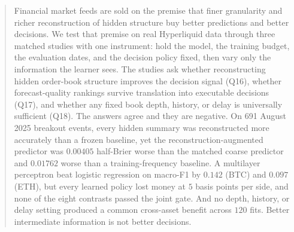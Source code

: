 \begin{abstract}
Financial market feeds are sold on the premise that finer granularity and richer
reconstruction of hidden structure buy better predictions and better decisions. We test
that premise on real Hyperliquid data through three matched studies with one instrument:
hold the model, the training budget, the evaluation dates, and the decision policy fixed,
then vary only the information the learner sees. The studies ask whether reconstructing
hidden order-book structure improves the decision signal (Q16), whether forecast-quality
rankings survive translation into executable decisions (Q17), and whether any fixed book
depth, history, or delay is universally sufficient (Q18). The answers agree and they are
negative. On 691 August 2025 breakout events, every hidden summary was reconstructed more
accurately than a frozen baseline, yet the reconstruction-augmented predictor was $0.00405$
half-Brier worse than the matched coarse predictor and $0.01762$ worse than a
training-frequency baseline. A multilayer perceptron beat logistic regression on macro-F1
by $0.142$ (BTC) and $0.097$ (ETH), but every learned policy lost money at $5$ basis points
per side, and none of the eight contrasts passed the joint gate. And no depth, history, or
delay setting produced a common cross-asset benefit across $120$ fits. Better intermediate
information is not better decisions.
\end{abstract}
